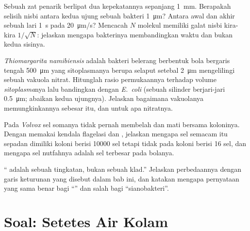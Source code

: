 \begin{exercise}[$\star\star$]\label{exo:b2:unicellular-diversity:9}
Sebuah zat penarik berlipat dua kepekatannya sepanjang \qty{1}{mm}.
Berapakah selisih nisbi antara kedua ujung sebuah bakteri
\qty{1}{\micro m}? Antara awal dan akhir sebuah lari \qty{1}{s} pada
\qty{20}{\micro m/s}? Mencacah $N$ molekul memiliki galat nisbi
kira-kira $1/\sqrt{N}$: jelaskan mengapa bakterinya membandingkan waktu
dan bukan kedua sisinya.
\end{exercise}

\begin{exercise}[$\star\star\star$]\label{exo:b2:unicellular-diversity:10}
\emph{Thiomargarita namibiensis} adalah bakteri belerang berbentuk bola
bergaris tengah \qty{500}{\micro m} yang sitoplasmanya berupa selaput
setebal \qty{2}{\micro m} mengelilingi sebuah vakuola nitrat. Hitunglah
rasio permukaannya terhadap volume \emph{sitoplasma}nya lalu
bandingkan dengan \emph{E.~coli} (sebuah silinder berjari-jari
\qty{0.5}{\micro m}; abaikan kedua ujungnya). Jelaskan bagaimana
vakuolanya memungkinkannya sebesar itu, dan untuk apa nitratnya.
\end{exercise}

\begin{exercise}[$\star\star\star$]\label{exo:b2:unicellular-diversity:11}
Pada \emph{Volvox} sel somanya tidak pernah membelah dan mati bersama
koloninya. Dengan memakai kendala flagelasi dan , jelaskan
mengapa sel semacam itu sepadan dimiliki koloni berisi \num{10000} sel
tetapi tidak pada koloni berisi 16 sel, dan mengapa sel nutfahnya
adalah sel terbesar pada bolanya.
\end{exercise}

\begin{exercise}[$\star\star\star$]\label{exo:b2:unicellular-diversity:12}
`` adalah sebuah tingkatan, bukan sebuah klad.'' Jelaskan
perbedaannya dengan garis keturunan yang disebut dalam bab ini, dan
katakan mengapa pernyataan yang sama benar bagi ``'' dan salah
bagi ``sianobakteri''.
\end{exercise}

\section{Soal: Setetes Air Kolam}

